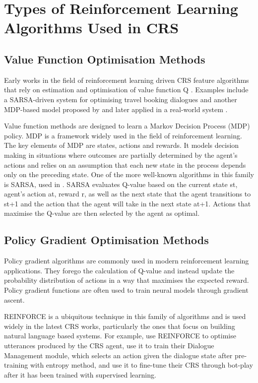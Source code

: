 \section{Types of Reinforcement Learning Algorithms Used in CRS}
\subsection{Value Function Optimisation Methods}
Early works in the field of reinforcement learning driven CRS feature algorithms that rely on estimation and optimisation of value function Q \citep{henderson2008hybrid, mahmood2007learning, mahmood2008adaptive, mahmood2009improving, mahmood2009learning}. Examples include a SARSA-driven system for optimising travel booking dialogues \citep{henderson2008hybrid} and another MDP-based model proposed by \cite{mahmood2007learning} and later applied in a real-world system \citep{mahmood2008adaptive, mahmood2009improving, mahmood2009learning}.

Value function methods are designed to learn a Markov Decision Process (MDP) policy. MDP is a framework widely used in the field of reinforcement learning. The key elements of MDP are states, actions and rewards. It models decision making in situations where outcomes are partially determined by the agent’s actions and relies on an assumption that each new state in the process depends only on the preceding state. One of the more well-known algorithms in this family is SARSA, used in \cite{henderson2008hybrid}. SARSA evaluates Q-value based on the current state st, agent’s action at, reward r, as well as the next state that the agent transitions to st+1 and the action that the agent will take in the next state at+1. Actions that maximise the Q-value are then selected by the agent as optimal.

\subsection{Policy Gradient Optimisation Methods}
Policy gradient algorithms are commonly used in modern reinforcement learning applications. They forego the calculation of Q-value and instead update the probability distribution of actions in a way that maximises the expected reward. Policy gradient functions are often used to train neural models through gradient ascent. 

REINFORCE is a ubiquitous technique in this family of algorithms and is used widely in the latest CRS works, particularly the ones that focus on building natural language based systems. For example, \cite{greco2017converse} use REINFORCE to optimise utterances produced by the CRS agent, \cite{sun2018conversational} use it to train their Dialogue Management module, which selects an action given the dialogue state after pre-training with entropy method, and \cite{kang2019recommendation} use it to fine-tune their CRS through bot-play after it has been trained with supervised learning.

